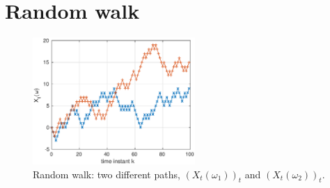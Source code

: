\documentclass[a4paper,10pt]{scrbook}
\begin{document}
\section{Random walk}
\begin{figure}
 \centering
 \includegraphics[width=0.55\textwidth]{figures/randomWalk}
 \caption{Random walk: two different paths, \((X_t(\omega_1))_t\) and \((X_t(\omega_2))_t\).}
 \label{fig:random_walk}
\end{figure}
\end{document}
